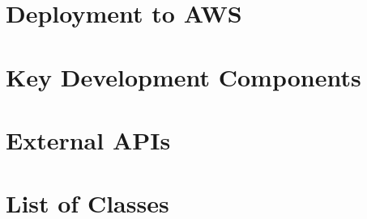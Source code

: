 \section{Deployment to AWS}

\section{Key Development Components}

\section{External APIs}

\section{List of Classes}
